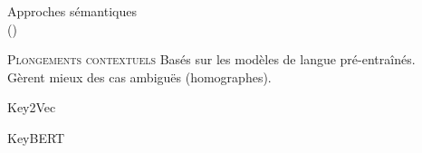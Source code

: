 \begin{frame}{Approches sémantiques\\ {\small(\hypersetup{citecolor=yellow}\cite{garaudsemantiques})}}
\begin{block}{\textsc{Plongements contextuels}}
\justifying
Basés sur les modèles de langue pré-entraînés.\\
Gèrent mieux des cas ambiguës (homographes).
\end{block}
\begin{itemize}
\item \small{Key2Vec \hfill \citep{mahata2018key2vec}
\item Key\textsc{BERT} \hfill \small{\citep{grootendorst2020keybert}}}
\end{itemize}
\end{frame}

